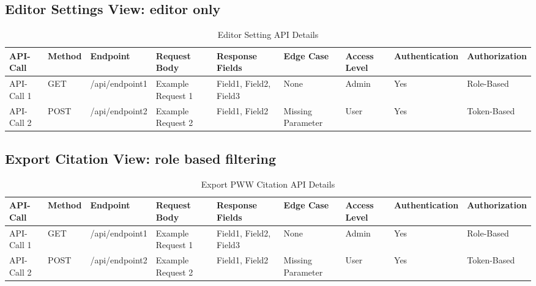 \documentclass[manuscript]{acmart}
\begin{document}
\newpage
\subsection{Editor Settings View: editor only}
\begin{table*}[h!]
  \scriptsize %
  \setlength{\tabcolsep}{4pt} %
  \caption{Editor Setting API Details}
  \label{tab:api-details}
  \begin{tabular}{llm{}
                  m{}
                  m{}
                  m{}
                  m{}
                  m{}}
    \toprule
    API-Call & Method & Endpoint & Request Body & Response Fields & Edge Case & Access Level & Authentication & Authorization \\
    \midrule
    API-Call 1 & GET & /api/endpoint1 & Example Request 1 & Field1, Field2, Field3 & None & Admin & Yes & Role-Based \\
    API-Call 2 & POST & /api/endpoint2 & Example Request 2 & Field1, Field2 & Missing Parameter & User & Yes & Token-Based \\
    \bottomrule
  \end{tabular}
\end{table*}

\subsection{Export Citation View: role based filtering}
\begin{table*}[h!]
  \scriptsize %
  \setlength{\tabcolsep}{4pt} %
  \caption{Export PWW Citation API Details}
  \label{tab:api-details}
  \begin{tabular}{llm{}
                  m{}
                  m{}
                  m{}
                  m{}
                  m{}}
    \toprule
    API-Call & Method & Endpoint & Request Body & Response Fields & Edge Case & Access Level & Authentication & Authorization \\
    \midrule
    API-Call 1 & GET & /api/endpoint1 & Example Request 1 & Field1, Field2, Field3 & None & Admin & Yes & Role-Based \\
    API-Call 2 & POST & /api/endpoint2 & Example Request 2 & Field1, Field2 & Missing Parameter & User & Yes & Token-Based \\
    \bottomrule
  \end{tabular}
\end{table*}
\end{document}
